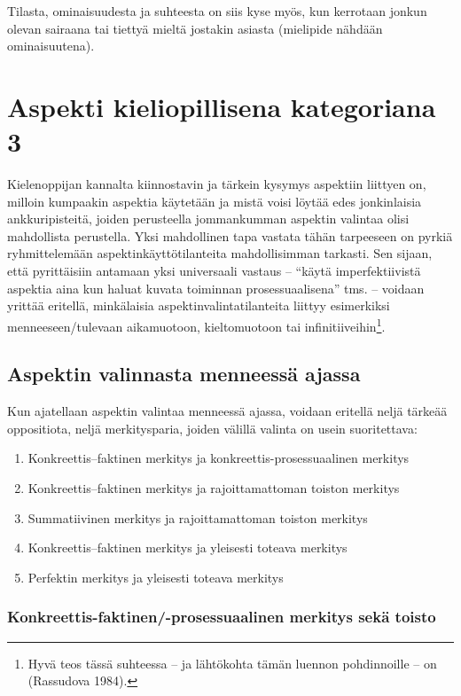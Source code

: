 \documentclass[]{scrreprt}
\providecommand{\tightlist}{%
  \setlength{\itemsep}{0pt}\setlength{\parskip}{0pt}}
\begin{document}
Tilasta, ominaisuudesta ja suhteesta on siis kyse myös, kun kerrotaan
jonkun olevan sairaana tai tiettyä mieltä jostakin asiasta (mielipide
nähdään ominaisuutena).

\chapter{Aspekti kieliopillisena kategoriana
3}\label{luento-17-aspekti-kieliopillisena-kategoriana-3}


Kielenoppijan kannalta kiinnostavin ja tärkein kysymys aspektiin
liittyen on, milloin kumpaakin aspektia käytetään ja mistä voisi löytää
edes jonkinlaisia ankkuripisteitä, joiden perusteella jommankumman
aspektin valintaa olisi mahdollista perustella. Yksi mahdollinen tapa
vastata tähän tarpeeseen on pyrkiä ryhmittelemään
aspektinkäyttötilanteita mahdollisimman tarkasti. Sen sijaan, että
pyrittäisiin antamaan yksi universaali vastaus -- ``käytä
imperfektiivistä aspektia aina kun haluat kuvata toiminnan
prosessuaalisena'' tms. -- voidaan yrittää eritellä, minkälaisia
aspektinvalintatilanteita liittyy esimerkiksi menneeseen/tulevaan
aikamuotoon, kieltomuotoon tai infinitiiveihin\footnote{Hyvä teos tässä
  suhteessa -- ja lähtökohta tämän luennon pohdinnoille -- on (Rassudova
  1984).}.

\section{Aspektin valinnasta menneessä
ajassa}\label{aspektin-valinnasta-menneessuxe4-ajassa}

Kun ajatellaan aspektin valintaa menneessä ajassa, voidaan eritellä
neljä tärkeää oppositiota, neljä merkitysparia, joiden välillä valinta
on usein suoritettava:

\begin{enumerate}
\def\labelenumi{\arabic{enumi}.}
\tightlist
\item
  Konkreettis--faktinen merkitys ja konkreettis-prosessuaalinen merkitys
\item
  Konkreettis--faktinen merkitys ja rajoittamattoman toiston merkitys
\item
  Summatiivinen merkitys ja rajoittamattoman toiston merkitys
\item
  Konkreettis--faktinen merkitys ja yleisesti toteava merkitys
\item
  Perfektin merkitys ja yleisesti toteava merkitys
\end{enumerate}

\subsection{Konkreettis-faktinen/-prosessuaalinen merkitys sekä
toisto}\label{konkreettis-faktinen-prosessuaalinen-merkitys-sekuxe4-toisto}
\end{document}
